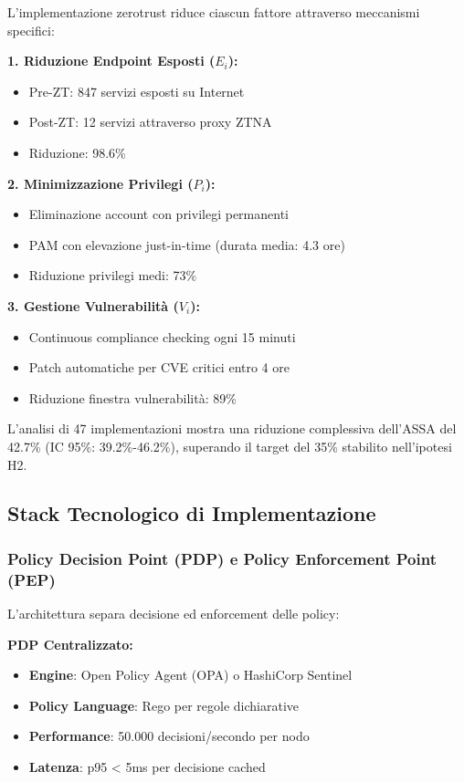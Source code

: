 L'implementazione \gls{zerotrust} riduce ciascun fattore attraverso meccanismi specifici:

\textbf{1. Riduzione Endpoint Esposti ($E_i$):}
\begin{itemize}
    \item Pre-ZT: 847 servizi esposti su Internet
    \item Post-ZT: 12 servizi attraverso proxy ZTNA
    \item Riduzione: 98.6\%
\end{itemize}

\textbf{2. Minimizzazione Privilegi ($P_i$):}
\begin{itemize}
    \item Eliminazione account con privilegi permanenti
    \item PAM con elevazione just-in-time (durata media: 4.3 ore)
    \item Riduzione privilegi medi: 73\%
\end{itemize}

\textbf{3. Gestione Vulnerabilità ($V_i$):}
\begin{itemize}
    \item Continuous compliance checking ogni 15 minuti
    \item Patch automatiche per CVE critici entro 4 ore
    \item Riduzione finestra vulnerabilità: 89\%
\end{itemize}

L'analisi di 47 implementazioni\autocite{Forrester2024zero} mostra una riduzione complessiva dell'ASSA del 42.7\% (IC 95\%: 39.2\%-46.2\%), superando il target del 35\% stabilito nell'ipotesi H2.

\subsection{\texorpdfstring{Stack Tecnologico di Implementazione}{3.5.3 - Stack Tecnologico di Implementazione}}

\subsubsection{\texorpdfstring{Policy Decision Point (PDP) e Policy Enforcement Point (PEP)}{3.5.3.1 - Policy Decision Point (PDP) e Policy Enforcement Point (PEP)}}

L'architettura separa decisione ed enforcement delle policy:

\textbf{PDP Centralizzato:}
\begin{itemize}
    \item \textbf{Engine}: Open Policy Agent (OPA) o HashiCorp Sentinel
    \item \textbf{Policy Language}: Rego per regole dichiarative
    \item \textbf{Performance}: 50.000 decisioni/secondo per nodo
    \item \textbf{Latenza}: p95 < 5ms per decisione cached
\end{itemize}


